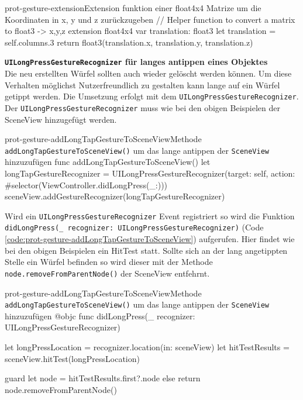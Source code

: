 \begin{description}
    \begin{code}{prot-gesture-extension}{Extension funktion einer float4x4 Matrize um die Koordinaten in x, y und z zurückzugeben}
    // Helper function to convert a matrix to float3 -> x,y,z
    extension float4x4 {
        var translation: float3 {
            let translation = self.columns.3
            return float3(translation.x, translation.y, translation.z)
        }
    }

    \textbf{\texttt{UILongPressGestureRecognizer} für langes antippen eines Objektes}\\

    Die neu erstellten Würfel sollten auch wieder gelöscht werden können. Um diese Verhalten möglichst Nutzerfreundlich zu gestalten kann lange auf ein Würfel getippt werden. Die Umsetzung erfolgt mit dem \texttt{UILongPressGestureRecognizer}. Der \texttt{UILongPressGestureRecognizer} muss wie bei den obigen Beispielen der SceneView hinzugefügt werden.

    \begin{code}{prot-gesture-addLongTapGestureToSceneView}{Methode \texttt{addLongTapGestureToSceneView()} um das lange antippen der \texttt{SceneView} hinzuzufügen}
    func addLongTapGestureToSceneView() {
        let longTapGestureRecognizer = UILongPressGestureRecognizer(target: self, action: #selector(ViewController.didLongPress(\_:)))
        sceneView.addGestureRecognizer(longTapGestureRecognizer)
    }
    \end{code}

    Wird ein \texttt{UILongPressGestureRecognizer} Event registriert so wird die Funktion \texttt{didLongPress(\_ recognizer: UILongPressGestureRecognizer)} (Code \ref{code:prot-gesture-addLongTapGestureToSceneView}) aufgerufen. Hier findet wie bei den obigen Beispielen ein HitTest statt. Sollte sich an der lang angetippten Stelle ein Würfel befinden so wird dieser mit der Methode \texttt{node.removeFromParentNode()} der SceneView entfehrnt.

    \begin{code}{prot-gesture-addLongTapGestureToSceneView}{Methode \texttt{addLongTapGestureToSceneView()} um das lange antippen der \texttt{SceneView} hinzuzufügen}
    @objc
    func didLongPress(\_ recognizer: UILongPressGestureRecognizer) {
        let longPressLocation = recognizer.location(in: sceneView)
        let hitTestResults = sceneView.hitTest(longPressLocation)
        
        guard let node = hitTestResults.first?.node else { return }
        node.removeFromParentNode()
    }
    \end{code}
    

\end{code}
\end{description}

